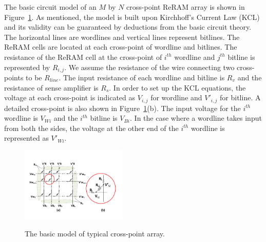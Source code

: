 

The basic circuit model of an $M$ by $N$ cross-point ReRAM array is shown
in Figure~\ref{fig:modeling}. As mentioned, the model is built upon Kirchhoff's Current Law (KCL) and its validity can be guaranteed by deductions from the basic
circuit theory. The horizontal lines are wordlines and vertical lines
represent bitlines. The ReRAM cells are located at each cross-point of
wordline and bitlines. The resistance of the ReRAM cell at the cross-point
of $i^{th}$ wordline and $j^{th}$ bitline is represented by $R_{i,j}$. We
assume the resistance of the wire connecting two cross-points to be
$R_{line}$. The input resistance of each wordline and bitline is $R_v$ and
the resistance of sense amplifier is $R_s$. In order to set up the KCL
equations, the voltage at each cross-point is indicated as $V_{i,j}$ for
wordline and $V'_{i,j}$ for bitline. A detailed cross-point is also shown
in Figure~\ref{fig:modeling}(b). The input voltage for the $i^{th}$
wordline is $V_{Wi}$ and the $i^{th}$ bitline is $V_{Bi}$. In the case
where a wordline takes input from both the sides, the voltage at the other
end of the $i^{th}$ wordline is represented as $V'_{Wi}$.

\begin{figure}%
\centering
  \includegraphics[width=0.45\textwidth]{./figures/model_f.pdf}\\
  \caption{The basic model of typical cross-point array.}\label{fig:modeling}
  \vspace{-12pt}
\end{figure}

